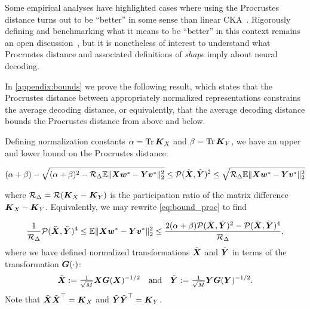 Some empirical analyses have highlighted cases where using the Procrustes distance turns out to be ``better'' in some sense than linear CKA~\cite{Ding2021,cloos2024differentiable}.
Rigorously defining and benchmarking what it means to be ``better'' in this context remains an open discussion~\cite{klabunde2024resi}, but it is nonetheless of interest to understand what Procrustes distance and associated definitions of \textit{shape} imply about neural decoding.

In \cref{appendix:bounds} we prove the following result, which states that the Procrustes distance between appropriately normalized representations constrains the average decoding distance, or equivalently, that the average decoding distance bounds the Procrustes distance from above and below.


\begin{proposition}\label{proposition:bounds}

Defining normalization constants $\alpha = \operatorname*{Tr} \boldsymbol{K}_X$ and $\beta = \operatorname*{Tr} \boldsymbol{K}_Y$, we have an upper and lower bound on the Procrustes distance:

\begin{equation}\label{eq:bound_proc}
 (\alpha + \beta) - \sqrt{(\alpha + \beta )^2 - \mathcal{R}_\Delta \mathbb{E} \Vert \boldsymbol{X} \boldsymbol{w}^* - \boldsymbol{Y} \boldsymbol{v}^* \Vert_2^2} \leq \mathcal{P} (\tilde{\boldsymbol{X}}, \tilde{\boldsymbol{Y}})^2 \le \sqrt{\mathcal{R}_\Delta \mathbb{E} \Vert \boldsymbol{X} \boldsymbol{w}^* - \boldsymbol{Y} \boldsymbol{v}^* \Vert_2^2}
\end{equation}

where $\mathcal{R}_\Delta = \mathcal{R}(\boldsymbol{K}_X - \boldsymbol{K}_Y)$ is the participation ratio of the matrix difference $\boldsymbol{K}_X - \boldsymbol{K}_Y$.
Equivalently, we may rewrite \cref{eq:bound_proc} to find

\begin{equation}\label{eq:bound_euclid}
\frac{1}{\mathcal{R}_\Delta}\mathcal{P} (\tilde{\boldsymbol{X}}, \tilde{\boldsymbol{Y}})^4 \le \mathbb{E} \Vert \boldsymbol{X} \boldsymbol{w}^* - \boldsymbol{Y} \boldsymbol{v}^* \Vert_2^2 \le \frac{2(\alpha + \beta)\mathcal{P} (\tilde{\boldsymbol{X}}, \tilde{\boldsymbol{Y}})^2 - \mathcal{P} (\tilde{\boldsymbol{X}}, \tilde{\boldsymbol{Y}})^4 }{{\mathcal{R}_\Delta}},
\end{equation}
where we have defined normalized transformations $\tilde{\boldsymbol{X}}$ and $\tilde{\boldsymbol{Y}}$ in terms of the transformation $\boldsymbol{G}(\cdot)$:
\begin{align*}
    \tilde{\boldsymbol{X}} := \tfrac{1}{\sqrt{M}} \boldsymbol{X} \boldsymbol{G}(\boldsymbol{X})^{-1/2}\quad\text{and}\quad \tilde{\boldsymbol{Y}} := \tfrac{1}{\sqrt{M}} \boldsymbol{Y} \boldsymbol{G}(\boldsymbol{Y})^{-1/2}.
\end{align*}
Note that $\tilde{\boldsymbol{X}}\tilde{\boldsymbol{X}}^\top = 
\boldsymbol{K}_X$ and $\tilde{\boldsymbol{Y}}\tilde{\boldsymbol{Y}}^\top = \boldsymbol{K}_Y$.
\end{proposition}


